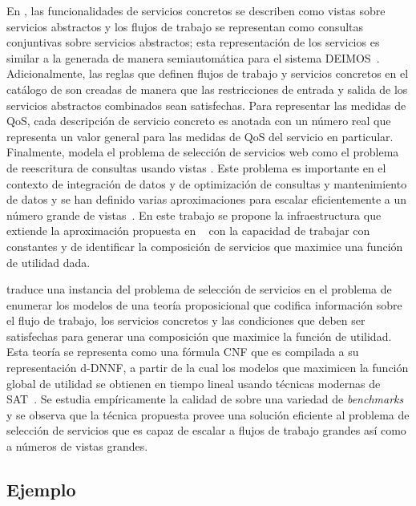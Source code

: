 En \mcdsatc, las funcionalidades de servicios concretos se describen
como vistas sobre servicios abstractos y los flujos de trabajo se representan
como consultas conjuntivas sobre servicios abstractos; esta representación de
los servicios es similar a la generada de manera semiautomática para el
sistema {\cal DEIMOS}~\cite{AmbiteISWC09}. Adicionalmente, las reglas
que definen flujos de trabajo y servicios concretos en el catálogo de
\mcdsatc son creadas de manera que las restricciones de entrada y salida
de los servicios abstractos combinados sean satisfechas. Para representar las
medidas de QoS, cada descripción de servicio concreto es anotada con un número
real que representa un valor general para las medidas de QoS del servicio en
particular. Finalmente, \mcdsatc modela el problema de selección de
servicios web como el problema de reescritura de consultas usando vistas
\cite{halevy:survey}. Este problema es importante en el contexto de integración
de datos \cite{Chen05,JaudoinPRST05} y de optimización de consultas y
mantenimiento de datos \cite{AfratiLU07,levy:bucket} y se han definido varias
aproximaciones para escalar eficientemente a un número grande de
vistas~\cite{arvelo:aaai06,pods:DuschkaG97,sac:DuschkaG97,levy:bucket,pottinger:minicon}.
En este trabajo se propone la infraestructura \mcdsatc que extiende la
aproximación propuesta en  ~\cite{arvelo:aaai06} con la capacidad de trabajar
con constantes y de identificar la composición de servicios que maximice una
función de utilidad dada.

\mcdsatc  traduce una instancia del problema de selección de servicios
en el problema de enumerar los modelos de una teoría proposicional que codifica
información sobre el flujo de trabajo, los servicios concretos y las condiciones
que deben ser satisfechas para generar una composición que maximice la función
de utilidad. Esta teoría se representa como una fórmula CNF que es compilada a
su representación d-DNNF, a partir de la cual los modelos que maximicen la
función global de utilidad se obtienen en tiempo lineal usando técnicas modernas
de SAT~\cite{darwiche:dnnf}. Se estudia empíricamente la calidad de \mcdsatc
sobre una variedad de \emph{benchmarks} y se observa que la técnica
propuesta provee una solución eficiente al problema de selección de servicios
que es capaz de escalar a flujos de trabajo grandes así como a números de vistas
grandes.

\subsection{Ejemplo}

